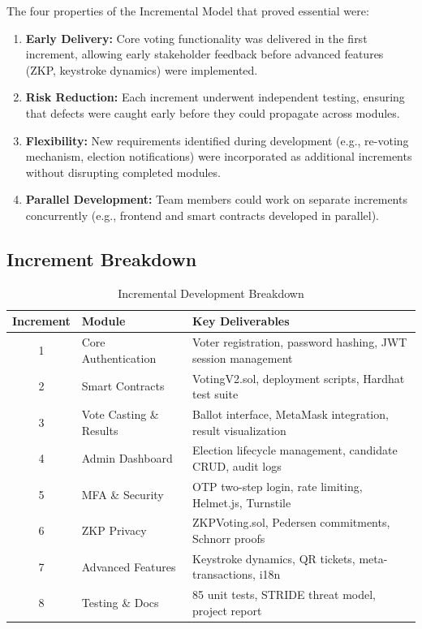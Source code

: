 \documentclass[oneside,a4paper,12pt]{book}
\begin{document}
The four properties of the Incremental Model that proved essential were:
\begin{enumerate}[leftmargin=1.5cm]
    \item \textbf{Early Delivery:} Core voting functionality was delivered in the first increment, allowing early stakeholder feedback before advanced features (ZKP, keystroke dynamics) were implemented.
    \item \textbf{Risk Reduction:} Each increment underwent independent testing, ensuring that defects were caught early before they could propagate across modules.
    \item \textbf{Flexibility:} New requirements identified during development (e.g., re-voting mechanism, election notifications) were incorporated as additional increments without disrupting completed modules.
    \item \textbf{Parallel Development:} Team members could work on separate increments concurrently (e.g., frontend and smart contracts developed in parallel).
\end{enumerate}

\subsection{Increment Breakdown}

\begin{table}[htbp]
\centering
\renewcommand{\arraystretch}{1.2}
\small
\begin{tabularx}{\textwidth}{|c|p{3.5cm}|X|}
\hline
\textbf{Increment} & \textbf{Module} & \textbf{Key Deliverables} \\
\hline
1 & Core Authentication & Voter registration, password hashing, JWT session management \\
\hline
2 & Smart Contracts & VotingV2.sol, deployment scripts, Hardhat test suite \\
\hline
3 & Vote Casting \& Results & Ballot interface, MetaMask integration, result visualization \\
\hline
4 & Admin Dashboard & Election lifecycle management, candidate CRUD, audit logs \\
\hline
5 & MFA \& Security & OTP two-step login, rate limiting, Helmet.js, Turnstile \\
\hline
6 & ZKP Privacy & ZKPVoting.sol, Pedersen commitments, Schnorr proofs \\
\hline
7 & Advanced Features & Keystroke dynamics, QR tickets, meta-transactions, i18n \\
\hline
8 & Testing \& Docs & 85 unit tests, STRIDE threat model, project report \\
\hline
\end{tabularx}
\caption{Incremental Development Breakdown}
\label{tab:increments}
\end{table}
\end{document}
